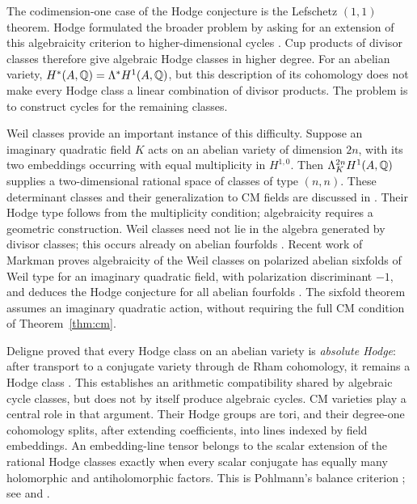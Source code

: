 The codimension-one case of the Hodge conjecture is the Lefschetz
\((1,1)\) theorem.  Hodge formulated the broader problem by asking
for an extension of this algebraicity criterion to higher-dimensional
cycles \cite[p.~184]{Hodge1952}.  Cup products of divisor classes therefore give
algebraic Hodge classes in higher degree.  For an abelian variety,
\(H^*(A,\mathbb{Q})=\Lambda^*H^1(A,\mathbb{Q})\), but this description of its
cohomology does not make every Hodge class a linear combination of
divisor products.  The problem is to construct cycles for the remaining
classes.

Weil classes provide an important instance of this difficulty.  Suppose
an imaginary quadratic field \(K\) acts on an abelian variety of
dimension \(2n\), with its two embeddings occurring with equal
multiplicity in \(H^{1,0}\).  Then
\(\Lambda_K^{2n}H^1(A,\mathbb{Q})\) supplies a two-dimensional rational
space of classes of type \((n,n)\).  These determinant classes and
their generalization to CM fields are discussed in
\cite[Proposition~4.4]{Deligne1982}.  Their Hodge type follows from
the multiplicity condition; algebraicity requires a geometric
construction.  Weil classes need not lie in the algebra generated by
divisor classes; this occurs already on abelian fourfolds
\cite[Theorem~0.1]{MoonenZarhin1999}.  Recent work of Markman proves
algebraicity of the Weil classes on polarized abelian sixfolds of
Weil type for an imaginary quadratic field, with polarization
discriminant \(-1\), and deduces the Hodge conjecture for all abelian
fourfolds \cite[Theorem~1.5.1 and Corollary~1.6.1]{Markman2025Secant}.
The sixfold theorem assumes an imaginary quadratic action, without
requiring the full CM condition of Theorem~\ref{thm:cm}.

Deligne proved that every Hodge class on an abelian variety is
\emph{absolute Hodge}: after transport to a conjugate variety through
de Rham cohomology, it remains a Hodge class
\cite[Main Theorem~2.11]{Deligne1982}.  This establishes an arithmetic
compatibility shared by algebraic cycle classes, but does not by itself
produce algebraic cycles.  CM varieties play a central role in that
argument.  Their Hodge groups are tori, and their degree-one cohomology
splits, after extending coefficients, into lines indexed by field
embeddings.  An embedding-line tensor belongs to the scalar extension
of the rational Hodge classes exactly when every scalar conjugate
has equally many holomorphic and antiholomorphic factors.
This is Pohlmann's balance criterion \cite{Pohlmann1968}; see
\cite[\S1.2(c)]{Milne2022} and
\cite[Theorem~3.1]{GaoUllmo2026}.

